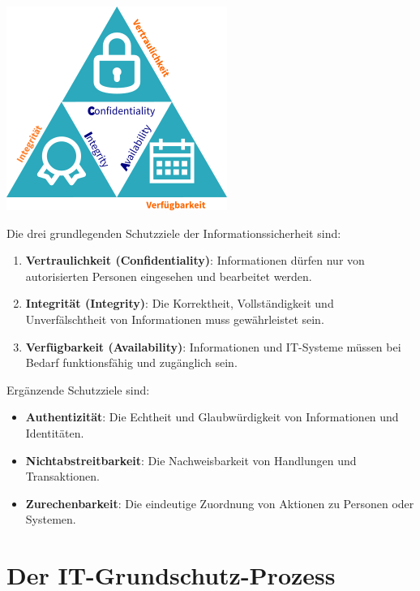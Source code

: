 \documentclass{orgstandard}
\begin{document}
\begin{center}
\includegraphics[width=.4\linewidth]{img/CIA.png}
\end{center}

Die drei grundlegenden Schutzziele der Informationssicherheit sind:
\begin{tolearn}
\begin{enumerate}
\item \textbf{Vertraulichkeit (Confidentiality)}: Informationen dürfen nur von autorisierten Personen eingesehen und bearbeitet werden.
\item \textbf{Integrität (Integrity)}: Die Korrektheit, Vollständigkeit und Unverfälschtheit von Informationen muss gewährleistet sein.
\item \textbf{Verfügbarkeit (Availability)}: Informationen und IT-Systeme müssen bei Bedarf funktionsfähig und zugänglich sein.
\end{enumerate}
\end{tolearn}
Ergänzende Schutzziele sind:
\begin{tolearn}
\begin{itemize}
\item \textbf{Authentizität}: Die Echtheit und Glaubwürdigkeit von Informationen und Identitäten.
\item \textbf{Nichtabstreitbarkeit}: Die Nachweisbarkeit von Handlungen und Transaktionen.
\item \textbf{Zurechenbarkeit}: Die eindeutige Zuordnung von Aktionen zu Personen oder Systemen.
\end{itemize}
\end{tolearn}

\section{Der IT-Grundschutz-Prozess}
\label{sec:org8697513}
\end{document}
